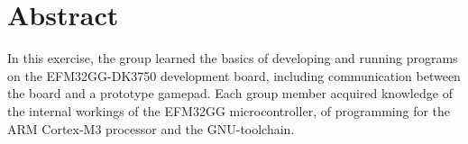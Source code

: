 \chapter{Abstract}
In this exercise, the group learned the basics of developing and running programs on the EFM32GG-DK3750 development board, including communication between the board and a prototype gamepad. Each group member acquired knowledge of the internal workings of the EFM32GG microcontroller, of programming for the ARM Cortex-M3 processor and the GNU-toolchain.


